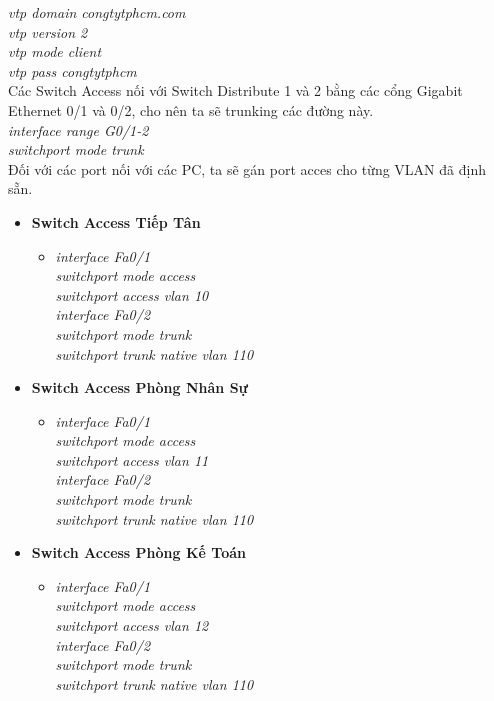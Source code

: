 \documentclass[12pt,a4paper]{report}
\begin{document}
\begin{itemize}
\hspace*{2cm}\textit{vtp domain congtytphcm.com\\
\hspace*{2cm}vtp version 2\\
\hspace*{2cm}vtp mode client\\
\hspace*{2cm}vtp pass congtytphcm\\} 
\hspace*{1cm}Các Switch Access nối với Switch Distribute 1 và 2 bằng các cổng Gigabit Ethernet 0/1 và 0/2, cho nên ta sẽ trunking các đường này.\\
\hspace*{2cm}\textit{interface range G0/1-2\\
\hspace*{2cm}switchport mode trunk\\}
\hspace*{1cm}Đối với các port nối với các PC, ta sẽ gán port acces cho từng VLAN đã định sẵn.
  \begin{itemize}
    \item \textbf{Switch Access Tiếp Tân}
    \begin{itemize}
      \item \textit{interface Fa0/1\\
switchport mode access\\
switchport access vlan 10 \\
interface Fa0/2\\
switchport mode trunk\\
switchport trunk native vlan 110\\}   
      
    \end{itemize}
    \item \textbf{Switch Access Phòng Nhân Sự}
     \begin{itemize}
      \item \textit{interface Fa0/1\\
switchport mode access\\
switchport access vlan 11\\
interface Fa0/2\\
switchport mode trunk\\
switchport trunk native vlan 110\\}
     
    \end{itemize}
     \item \textbf{Switch Access Phòng Kế Toán}
     \begin{itemize}
      \item \textit{interface Fa0/1\\
switchport mode access\\
switchport access vlan 12\\
interface Fa0/2\\
switchport mode trunk\\
switchport trunk native vlan 110\\}
     

\end{itemize}
\end{itemize}
\end{itemize}
\end{document}
